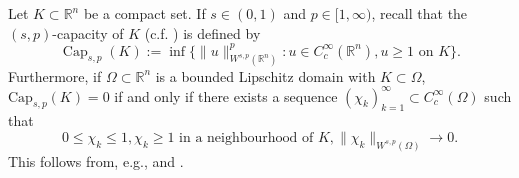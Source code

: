 \documentclass[12pt]{article}
\newcommand{\R}{\mathbb{R}}
\theoremstyle{plain}
\numberwithin{equation}{section}
\begin{document}
Let $K \subset \R^n$ be a compact set. If $s \in (0,1)$ and $p \in [1,\infty)$, recall that the $(s,p)$-capacity of $K$ (c.f. \cite[Definition 2.2.1]{adams_hedberg}) is defined by
\begin{equation} \label{eq:def_cap_wsp}
    \operatorname{Cap}_{s,p}(K) := \inf \big\{ \|u\|_{W^{s,p}(\R^n)}^p: u \in C^\infty_c(\R^n) , u \geq 1 \text{ on } K \big\}.
\end{equation}
Furthermore, if $\Omega \subset\R^n$ is a bounded Lipschitz domain with $K \subset \Omega$, $\mathrm{Cap}_{s,p}(K) = 0$ if and only if there exists a sequence $(\chi_k)_{k=1}^\infty \subset C^\infty_c(\Omega)$ such that
\begin{equation*}
     0 \leq \chi_k \leq 1, \chi_k \geq 1 \text{ in a neighbourhood of } K, \|\chi_k\|_{W^{s,p}(\Omega)} \to 0.
\end{equation*}
This follows from, e.g., \cite[Lemma 5.3]{diNezza_12} and \cite[Theorem 2.1]{shi_xiao_16}.
\end{document}
